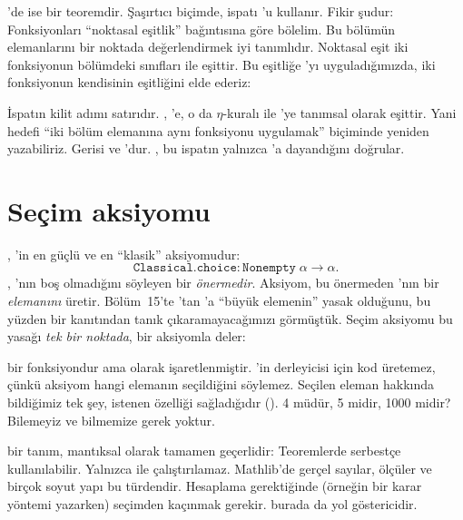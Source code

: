 \Lean{}'de ise  bir teoremdir. Şaşırtıcı biçimde, ispatı
'u kullanır. Fikir şudur: Fonksiyonları ``noktasal eşitlik''
bağıntısına göre bölelim. Bu bölümün elemanlarını bir noktada
değerlendirmek iyi tanımlıdır. Noktasal eşit iki fonksiyonun bölümdeki
sınıfları  ile eşittir. Bu eşitliğe 'yı
uyguladığımızda, iki fonksiyonun kendisinin eşitliğini elde ederiz:


\noindent İspatın kilit adımı  satırıdır.
, 'e, o da $\eta$-kuralı
ile 'ye tanımsal olarak eşittir. Yani hedefi ``iki bölüm elemanına
aynı fonksiyonu uygulamak'' biçiminde yeniden yazabiliriz. Gerisi
 ve 'dur.  , bu
ispatın yalnızca 'a dayandığını doğrular.


\section{Seçim aksiyomu}\label{sec:secim}

, \Lean{}'in en güçlü ve en ``klasik'' aksiyomudur:
\[
  \texttt{Classical.choice} : \texttt{Nonempty}\;\alpha \to \alpha .
\]
, 'nın boş olmadığını söyleyen bir \emph{önermedir}.
Aksiyom, bu önermeden 'nın bir \emph{elemanını} üretir. Bölüm~15'te
'tan 'a ``büyük elemenin'' yasak olduğunu, bu yüzden bir
 kanıtından tanık çıkaramayacağımızı görmüştük. Seçim aksiyomu bu
yasağı \emph{tek bir noktada}, bir aksiyomla deler:


\noindent {} bir fonksiyondur ama  olarak
işaretlenmiştir. \Lean{}'in derleyicisi  için kod
üretemez, çünkü aksiyom hangi elemanın seçildiğini söylemez. Seçilen eleman
hakkında bildiğimiz tek şey, istenen özelliği sağladığıdır
().  4 müdür, 5 midir, 1000 midir?
Bilemeyiz ve bilmemize gerek yoktur.

\begin{dikkat}
 bir tanım, mantıksal olarak tamamen geçerlidir:
Teoremlerde serbestçe kullanılabilir. Yalnızca  ile
çalıştırılamaz. Mathlib'de gerçel sayılar, ölçüler ve birçok soyut yapı
bu türdendir. Hesaplama gerektiğinde (örneğin bir karar yöntemi
yazarken) seçimden kaçınmak gerekir.   burada
da yol göstericidir.
\end{dikkat}

